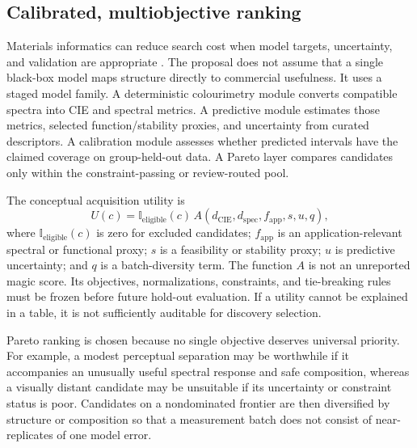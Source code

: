 \documentclass[conference]{IEEEtran}
\begin{document}
\subsection{Calibrated, multiobjective ranking}

Materials informatics can reduce search cost when model targets, uncertainty, and validation are appropriate \cite{butler,curtarolo}. The proposal does not assume that a single black-box model maps structure directly to commercial usefulness. It uses a staged model family. A deterministic colourimetry module converts compatible spectra into CIE and spectral metrics. A predictive module estimates those metrics, selected function/stability proxies, and uncertainty from curated descriptors. A calibration module assesses whether predicted intervals have the claimed coverage on group-held-out data. A Pareto layer compares candidates only within the constraint-passing or review-routed pool.

The conceptual acquisition utility is
\begin{equation}
U(c)=\mathbb{I}_{\mathrm{eligible}}(c)\,A\!\left(d_{\mathrm{CIE}},d_{\mathrm{spec}},f_{\mathrm{app}},s,u,q\right),
\label{eq:utility}
\end{equation}
where $\mathbb{I}_{\mathrm{eligible}}(c)$ is zero for excluded candidates; $f_{\mathrm{app}}$ is an application-relevant spectral or functional proxy; $s$ is a feasibility or stability proxy; $u$ is predictive uncertainty; and $q$ is a batch-diversity term. The function $A$ is not an unreported magic score. Its objectives, normalizations, constraints, and tie-breaking rules must be frozen before future hold-out evaluation. If a utility cannot be explained in a table, it is not sufficiently auditable for discovery selection.

Pareto ranking is chosen because no single objective deserves universal priority. For example, a modest perceptual separation may be worthwhile if it accompanies an unusually useful spectral response and safe composition, whereas a visually distant candidate may be unsuitable if its uncertainty or constraint status is poor. Candidates on a nondominated frontier are then diversified by structure or composition so that a measurement batch does not consist of near-replicates of one model error.
\end{document}
